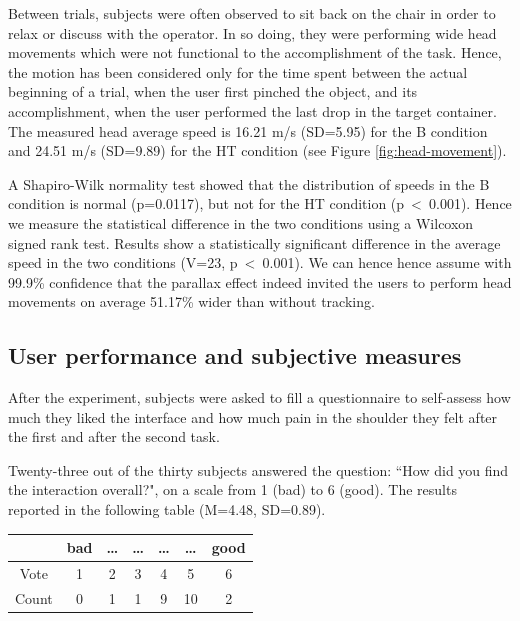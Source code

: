 Between trials, subjects were often observed to sit back on the chair in order to relax or discuss with the operator. In so doing, they were performing wide head movements which were not functional to the accomplishment of the task.
Hence, the motion has been considered only for the time spent between the actual beginning of a trial, when the user first pinched the object, and its accomplishment, when the user performed the last drop in the target container.
The measured head average speed is 16.21 m/s (SD=5.95) for the B condition and 24.51 m/s (SD=9.89) for the HT condition (see Figure \ref{fig:head-movement}).

A Shapiro-Wilk normality test showed that the distribution of speeds in the B condition is normal (p=0.0117), but not for the HT condition (p~\textless~0.001). Hence we measure the statistical difference in the two conditions using a Wilcoxon signed rank test. Results show a statistically significant difference in the average speed in the two conditions (V=23, p~\textless~0.001).
We can hence hence assume with 99.9\% confidence that the parallax effect indeed invited the users to perform head movements on average 51.17\% wider than without tracking.


\subsection{User performance and subjective measures}


After the experiment, subjects were asked to fill a questionnaire to self-assess how much they liked the interface and how much pain in the shoulder they felt after the first and after the second task.

Twenty-three out of the thirty subjects answered the question: ``How did you find the interaction overall?", on a scale from 1 (bad) to 6 (good). The results reported in the following table (M=4.48, SD=0.89).


\begin{center}
\begin{tabular}{ | c | c | c | c | c | c | c | }
\hline
& bad & \ldots  & \ldots & \ldots & \ldots & good \\
\hline
Vote & 1 & 2 & 3 & 4 & 5 & 6 \\
\hline
Count & 0 & 1 & 1 & 9 & 10 & 2 \\
\hline
\end{tabular}\end{center}

